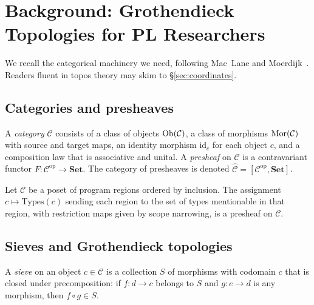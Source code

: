 \documentclass[11pt]{article}
\begin{document}
\section{Background: Grothendieck Topologies for PL Researchers}\label{sec:background}

We recall the categorical machinery we need, following Mac~Lane and
Moerdijk~\cite{MacLaneMoerdijk1994}.  Readers fluent in topos theory may
skim to \S\ref{sec:coordinates}.

\subsection{Categories and presheaves}

A \emph{category} $\mathcal{C}$ consists of a class of objects $\mathrm{Ob}(\mathcal{C})$,
a class of morphisms $\mathrm{Mor}(\mathcal{C})$ with source and target maps, an
identity morphism $\mathrm{id}_c$ for each object $c$, and a composition law
that is associative and unital.
A \emph{presheaf} on $\mathcal{C}$ is a contravariant functor
$F \colon \mathcal{C}^{\mathrm{op}} \to \mathbf{Set}$.
The category of presheaves is denoted $\widehat{\mathcal{C}} =
[\mathcal{C}^{\mathrm{op}}, \mathbf{Set}]$.

\begin{example}
Let $\mathcal{C}$ be a poset of program regions ordered by inclusion.
The assignment $c \mapsto \mathrm{Types}(c)$ sending each region to the set
of types mentionable in that region, with restriction maps given by scope
narrowing, is a presheaf on $\mathcal{C}$.
\end{example}

\subsection{Sieves and Grothendieck topologies}

\begin{definition}[Sieve]\label{def:sieve}
A \emph{sieve} on an object $c \in \mathcal{C}$ is a collection $S$ of
morphisms with codomain $c$ that is closed under precomposition: if
$f \colon d \to c$ belongs to $S$ and $g \colon e \to d$ is any morphism,
then $f \circ g \in S$.
\end{definition}
\end{document}
